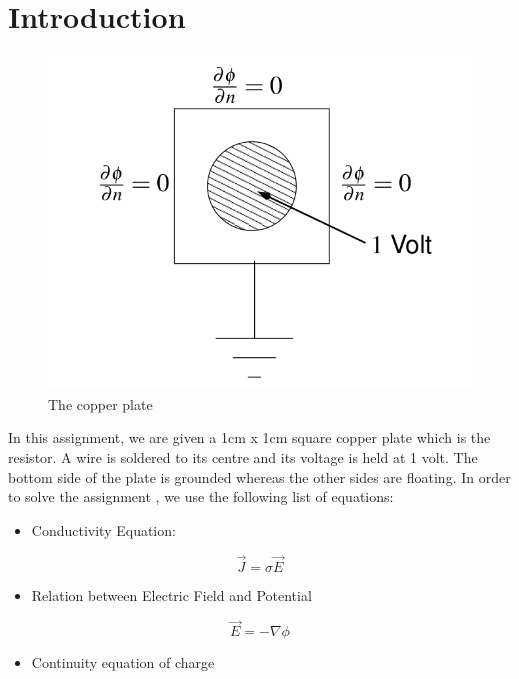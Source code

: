 \documentclass{article}
\begin{document}
  \section{Introduction}
	\begin{figure}
\centering
\includegraphics[width=.98\linewidth]{plateimage.png}
\caption{The copper plate}
\end{figure}
	In this assignment, we are given a 1cm x 1cm square copper plate which is the resistor. A wire is soldered to its centre and its voltage is held at 1 volt. The bottom side of the plate is grounded whereas the other sides are floating. \newline
	In order to solve the assignment , we use the following list of equations:
	\begin{itemize}

    \item
      Conductivity Equation:
    \end{itemize}
    \begin{equation}
    \vec{J} = \sigma\vec{E}
       \end{equation}
    \begin{itemize}
    \item
      Relation between Electric Field and Potential
    \end{itemize}
    
    \begin{equation}
    \vec{E} = -\nabla{\phi}
       \end{equation}
    
    \begin{itemize}
    \item
      Continuity equation of charge
    \end{itemize}
    
\end{document}
